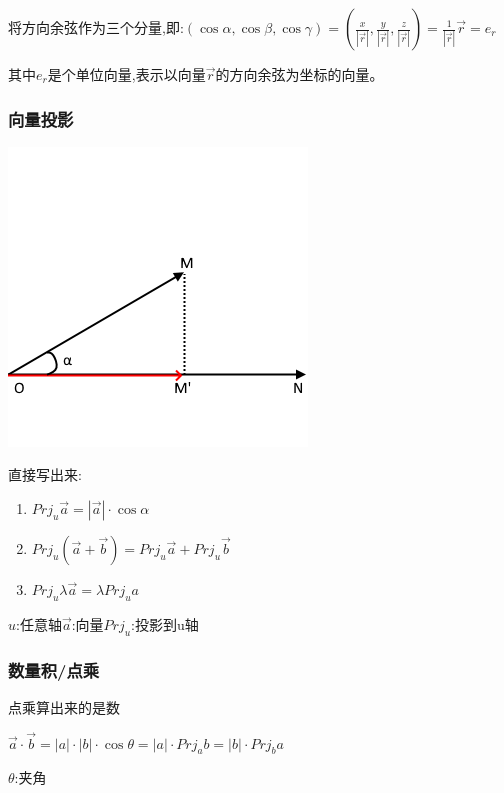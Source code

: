 \documentclass[UTF8]{ctexbook}
\newcommand{\projection}[1]{Prj_{#1}}
\begin{document}
{{{{      将方向余弦作为三个分量,即:$(\cos\alpha,\cos\beta,\cos\gamma) = (\frac{x}{|\vec{r}|}, \frac{y}{|\vec{r}|}, \frac{z}{|\vec{r}|}) = \frac{1}{|\vec{r}|}\vec{r} = e_r$

      其中$e_r$是个单位向量,表示以向量$\vec{r}$的方向余弦为坐标的向量。

    }%

    \subsubsection{向量投影}{
      \includegraphics{resources/vector_axis_projection.png}

      直接写出来:
      \begin{enumerate}
        \item $\projection{u}\vec{a} = |\vec{a}|\cdot\cos\alpha$
        \item $\projection{u}(\vec{a} + \vec{b}) = \projection{u}\vec{a} + \projection{u}\vec{b}$
        \item $\projection{u}\lambda\vec{a} = \lambda\projection{u}a$
      \end{enumerate}

      $u$:任意轴\qquad$\vec{a}$:向量\qquad$\projection{u}$:投影到u轴

    }%

    \subsubsection{数量积/点乘}{
      点乘算出来的是数

      $\vec{a} \cdot \vec{b} = |a|\cdot|b|\cdot\cos\theta = |a|\cdot\projection{a}b = |b|\cdot\projection{b}a$

      $\theta$:夹角\\

}}}}
\end{document}
